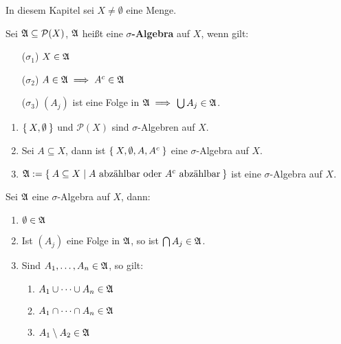 In diesem Kapitel sei $X \neq \emptyset$ eine Menge.

\begin{definition}
    Sei $\mathfrak{A}\subseteq\mathcal{P}(X)$, $\mathfrak{A}$ heißt eine 
    \textbf{$\sigma$-Algebra} auf $X$, wenn gilt:
    \begin{enumerate}
        \item[($\sigma_1$)] $X\in\mathfrak{A}$
        \item[($\sigma_2$)] $A\in\mathfrak{A} \implies A^c\in\mathfrak{A}$
        \item[($\sigma_3$)] $(A_j)$ ist eine Folge in $\mathfrak{A} \implies$
                            $\bigcup A_j\in\mathfrak{A}$.
    \end{enumerate}
\end{definition}

\begin{beispieleX}
    \begin{enumerate}
        \item $\Set{X,\emptyset}$ und $\mathcal{P}(X)$ sind 
              $\sigma$-Algebren auf $X$.
        \item Sei $A\subseteq X$, dann ist $\Set{X,\emptyset, A, A^c}$ 
              eine $\sigma$-Algebra auf $X$.
        \item $\mathfrak{A}:=\Set{A\subseteq X | A \text{ abzählbar oder } A^c \text{ abzählbar}}$ 
              ist eine $\sigma$-Algebra auf $X$.
    \end{enumerate}
\end{beispieleX}

\begin{lemma}
\label{Lemma 1.1}
Sei $\mathfrak{A}$ eine $\sigma$-Algebra auf $X$, dann:
\begin{enumerate}
\item $\emptyset\in\mathfrak{A}$
\item Ist $(A_j)$ eine Folge in $\mathfrak{A}$, so ist $\bigcap A_j\in\mathfrak{A}$.
\item Sind $A_1,\dots,A_n\in\mathfrak{A}$, so gilt:
\begin{enumerate}
\item $A_1\cup\dots\cup A_n\in\mathfrak{A}$
\item $A_1\cap\dots\cap A_n\in\mathfrak{A}$
\item $A_1\setminus A_2\in\mathfrak{A}$
\end{enumerate}
\end{enumerate}
\end{lemma}

